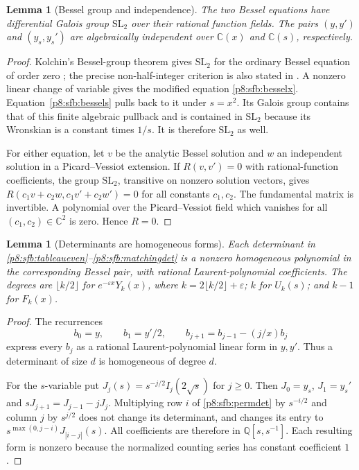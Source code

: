 \documentclass[11pt,a4paper]{article}
\newtheorem{lemma}[theorem]{Lemma}
\theoremstyle{definition}
\theoremstyle{remark}
\numberwithin{equation}{section}
\begin{document}
\begin{lemma}[Bessel group and independence]\label{p8:sfb:independence}
The two Bessel equations have differential Galois group
$\mathrm{SL}_2$ over their rational function fields.  The
pairs $(y,y')$ and $(y_s,y_s')$ are algebraically independent
over $\mathbb C(x)$ and $\mathbb C(s)$, respectively.
\end{lemma}
\begin{proof}
Kolchin's Bessel-group theorem gives $\mathrm{SL}_2$ for
the ordinary Bessel equation of order zero
\cite{p5:BG_Kolchin1968}; the precise non-half-integer criterion is
also stated in \cite[Example 1.3.32]{p8:SFB_Singer}.
A nonzero linear change of variable gives the modified equation
\eqref{p8:sfb:besselx}.  Equation~\eqref{p8:sfb:bessels} pulls back
to it under $s=x^2$.  Its Galois group contains that of this
finite algebraic pullback and is contained in $\mathrm{SL}_2$
because its Wronskian is a constant times $1/s$.  It is
therefore $\mathrm{SL}_2$ as well.

For either equation, let $v$ be the analytic Bessel solution and
$w$ an independent solution in a Picard--Vessiot extension.
If $R(v,v')=0$ with rational-function coefficients, the group
$\mathrm{SL}_2$, transitive on nonzero solution vectors, gives
$R(c_1v+c_2w,c_1v'+c_2w')=0$ for all constants $c_1,c_2$.
The fundamental matrix is invertible.  A polynomial over the
Picard--Vessiot field which vanishes for all $(c_1,c_2)\in
\mathbb C^2$ is zero.  Hence $R=0$.
\end{proof}

\begin{lemma}[Determinants are homogeneous forms]\label{p8:sfb:forms}
Each determinant in \eqref{p8:sfb:tableaueven}--\eqref{p8:sfb:matchingdet}
is a nonzero homogeneous polynomial in the corresponding Bessel
pair, with rational Laurent-polynomial coefficients.  The degrees
are $\lfloor k/2\rfloor$ for $e^{-\varepsilon x}Y_k(x)$,
where $k=2\lfloor k/2\rfloor+\varepsilon$; $k$ for $U_k(s)$;
and $k-1$ for $F_k(x)$.
\end{lemma}
\begin{proof}
The recurrences
\[
 b_0=y,\qquad b_1=y'/2,\qquad
 b_{j+1}=b_{j-1}-(j/x)b_j
\]
express every $b_j$ as a rational Laurent-polynomial linear
form in $y,y'$.  Thus a determinant of size $d$ is homogeneous
of degree $d$.

For the $s$-variable put
$J_j(s)=s^{-j/2}I_j(2\sqrt{s})$ for $j\ge0$.
Then $J_0=y_s$, $J_1=y_s'$ and
$sJ_{j+1}=J_{j-1}-jJ_j$.
Multiplying row $i$ of \eqref{p8:sfb:permdet} by $s^{-i/2}$
and column $j$ by $s^{j/2}$ does not change its determinant,
and changes its entry to
$s^{\max(0,j-i)}J_{|i-j|}(s)$.
All coefficients are therefore in $\mathbb Q[s,s^{-1}]$.
Each resulting form is nonzero because the normalized counting
series has constant coefficient $1$.
\end{proof}
\end{document}
